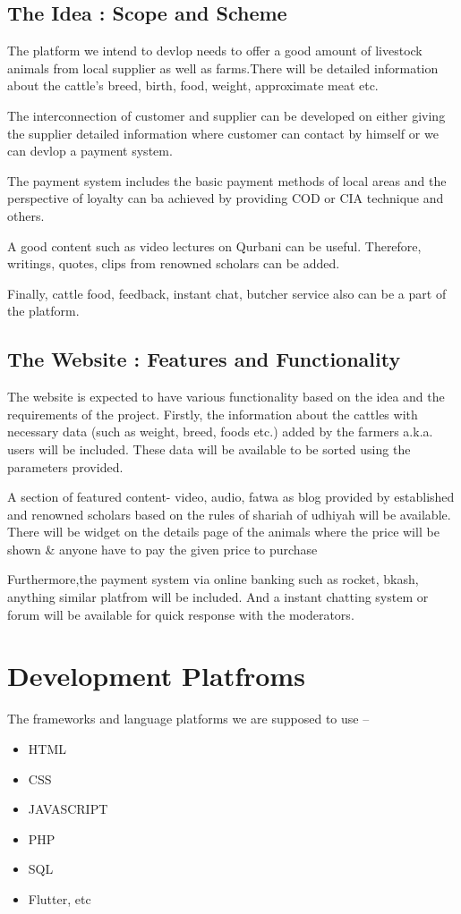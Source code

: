 \documentclass[a4paper,12pt]{report}
\begin{document}
\subsection*{The Idea : Scope and Scheme}
The platform we intend to devlop needs to offer a good amount of  livestock animals from local supplier as well as farms.There will be detailed information about the cattle's breed, birth, food, weight, approximate meat etc.

The interconnection of customer and supplier can be developed on either giving the supplier detailed information where customer can contact by himself or we can devlop a payment system.


The payment system includes the basic payment methods of local areas and the perspective of loyalty can ba achieved by providing COD or CIA technique and others.

A good content such as video lectures on Qurbani can be useful. Therefore, writings, quotes, clips from renowned scholars can be added.

Finally, cattle food, feedback, instant chat, butcher service also can be a part of the platform.

\subsection*{The Website : Features and Functionality}

The website is expected to have various functionality based on the idea and the requirements of the project. Firstly, the information about the cattles with necessary data (such as weight, breed, foods etc.) added by the farmers a.k.a. users will be included. These data will be available to be sorted using the parameters provided.

A section of featured content- video, audio, fatwa as blog provided by established and renowned scholars based on the rules of shariah of udhiyah will be available.
There will be widget on the details page of the animals where the price will be shown & anyone have to pay the given price to purchase %

Furthermore,the payment system via online banking such as rocket, bkash, anything similar platfrom will be included. And a instant chatting system or forum will be available for quick response with the moderators.

\section*{Development Platfroms}
The frameworks and language platforms we are supposed to use --
\begin{itemize}
	\item HTML
	\item CSS
	\item JAVASCRIPT
	\item PHP
	\item SQL
\item Flutter, etc
\end{itemize}
\end{document}
